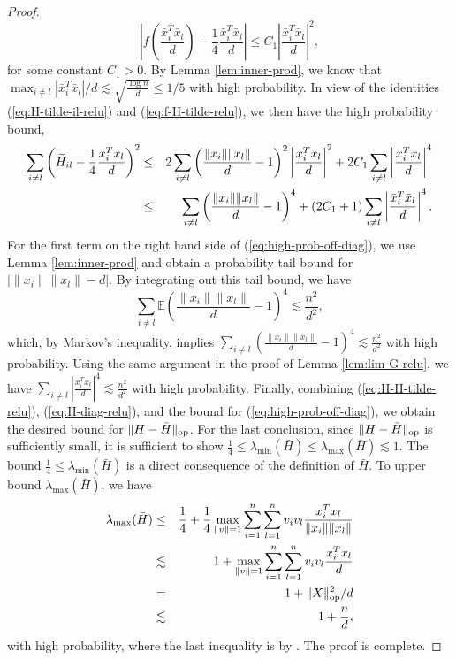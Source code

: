 \begin{proof}
$$\left|f\left(\frac{\bar{x}_i^T\bar{x}_l}{d}\right)-\frac{1}{4}\frac{\bar{x}_i^T\bar{x}_l}{d}\right|\leq C_1\left|\frac{\bar{x}_i^T\bar{x}_l}{d}\right|^2,$$
for some constant $C_1>0$. By Lemma \ref{lem:inner-prod}, we know that $\max_{i\neq l}|\bar{x}_i^T\bar{x}_l|/d\lesssim \sqrt{\frac{\log n}{d}}\leq 1/5$ with high probability. In view of the identities (\ref{eq:H-tilde-il-relu}) and (\ref{eq:f-H-tilde-relu}), we then have the high probability bound,
\begin{eqnarray}
\nonumber \sum_{i\neq l}\left(\wt{H}_{il}-\frac{1}{4}\frac{\bar{x}_i^T\bar{x}_l}{d}\right)^2 &\leq& 2\sum_{i\neq l}\left(\frac{\|x_i\|\|x_l\|}{d}-1\right)^2\left|\frac{\bar{x}_i^T\bar{x}_l}{d}\right|^2  + 2C_1\sum_{i\neq l}\left|\frac{\bar{x}_i^T\bar{x}_l}{d}\right|^4 \\
 \label{eq:high-prob-off-diag} &\leq& \sum_{i\neq l}\left(\frac{\|x_i\|\|x_l\|}{d}-1\right)^4 + (2C_1+1)\sum_{i\neq l}\left|\frac{\bar{x}_i^T\bar{x}_l}{d}\right|^4.
\end{eqnarray}
For the first term on the right hand side of (\ref{eq:high-prob-off-diag}), we use Lemma \ref{lem:inner-prod} and obtain a probability tail bound for $|\|x_i\|\|x_l\|-d|$. By integrating out this tail bound, we have
$$\sum_{i\neq l}\mathbb{E}\left(\frac{\|x_i\|\|x_l\|}{d}-1\right)^4\lesssim \frac{n^2}{d^2},$$
which, by Markov's inequality, implies $\sum_{i\neq l}\left(\frac{\|x_i\|\|x_l\|}{d}-1\right)^4\lesssim \frac{n^2}{d^2}$ with high probability. 
Using the same argument in the proof of Lemma \ref{lem:lim-G-relu}, we have $\sum_{i\neq l}\left|\frac{x_i^Tx_l}{d}\right|^4\lesssim \frac{n^2}{d^2}$ with high probability.
Finally, combining (\ref{eq:H-H-tilde-relu}), (\ref{eq:H-diag-relu}), and the bound for (\ref{eq:high-prob-off-diag}), we obtain the desired bound for $\|H-\bar{H}\|_{\rm op}$.
For the last conclusion, since $\|H-\bar{H}\|_{\rm op}$ is sufficiently small, it is sufficient to show $\frac{1}{4}\leq\lambda_{\min}(\bar{H})\leq\lambda_{\max}(\bar{H})\lesssim 1$. The bound $\frac{1}{4}\leq\lambda_{\min}(\bar{H})$ is a direct consequence of the definition of $\bar{H}$. To upper bound $\lambda_{\max}(\bar{H})$, we have
\begin{eqnarray*}
\lambda_{\max}(\bar{H}) &\leq& \frac{1}{4} + \frac{1}{4}\max_{\|v\|=1}\sum_{i=1}^n\sum_{l=1}^nv_iv_l\frac{x_i^Tx_l}{\|x_i\|\|x_l\|} \\
&\lesssim& 1 + \max_{\|v\|=1}\sum_{i=1}^n\sum_{l=1}^nv_iv_l\frac{x_i^Tx_l}{d} \\
&=& 1 + \opnorm{X}^2/d \\
&\lesssim& 1 + \frac{n}{d},
\end{eqnarray*}
with high probability, where the last inequality is by \cite{davidson2001local}. The proof is complete.
\end{proof}


